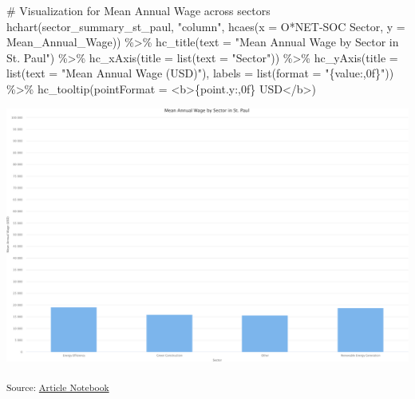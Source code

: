 \documentclass[
  letterpaper,
  DIV=11,
  numbers=noendperiod]{scrartcl}
\newenvironment{Shaded}{\begin{snugshade}}{\end{snugshade}}
\newcommand{\AttributeTok}[1]{\textcolor[rgb]{0.40,0.45,0.13}{#1}}
\newcommand{\CommentTok}[1]{\textcolor[rgb]{0.37,0.37,0.37}{#1}}
\newcommand{\FunctionTok}[1]{\textcolor[rgb]{0.28,0.35,0.67}{#1}}
\newcommand{\NormalTok}[1]{\textcolor[rgb]{0.00,0.23,0.31}{#1}}
\newcommand{\SpecialCharTok}[1]{\textcolor[rgb]{0.37,0.37,0.37}{#1}}
\newcommand{\StringTok}[1]{\textcolor[rgb]{0.13,0.47,0.30}{#1}}
\begin{document}
\begin{Shaded}
\begin{Highlighting}[]
\CommentTok{\# Visualization for Mean Annual Wage across sectors}
\FunctionTok{hchart}\NormalTok{(sector\_summary\_st\_paul, }\StringTok{"column"}\NormalTok{, }\FunctionTok{hcaes}\NormalTok{(}\AttributeTok{x =} \StringTok{\textasciigrave{}}\AttributeTok{O*NET{-}SOC Sector}\StringTok{\textasciigrave{}}\NormalTok{, }\AttributeTok{y =}\NormalTok{ Mean\_Annual\_Wage)) }\SpecialCharTok{\%\textgreater{}\%}
  \FunctionTok{hc\_title}\NormalTok{(}\AttributeTok{text =} \StringTok{"Mean Annual Wage by Sector in St. Paul"}\NormalTok{) }\SpecialCharTok{\%\textgreater{}\%}
  \FunctionTok{hc\_xAxis}\NormalTok{(}\AttributeTok{title =} \FunctionTok{list}\NormalTok{(}\AttributeTok{text =} \StringTok{"Sector"}\NormalTok{)) }\SpecialCharTok{\%\textgreater{}\%}
  \FunctionTok{hc\_yAxis}\NormalTok{(}\AttributeTok{title =} \FunctionTok{list}\NormalTok{(}\AttributeTok{text =} \StringTok{"Mean Annual Wage (USD)"}\NormalTok{), }\AttributeTok{labels =} \FunctionTok{list}\NormalTok{(}\AttributeTok{format =} \StringTok{"\{value:,0f\}"}\NormalTok{)) }\SpecialCharTok{\%\textgreater{}\%}
  \FunctionTok{hc\_tooltip}\NormalTok{(}\AttributeTok{pointFormat =} \StringTok{\textquotesingle{}\textless{}b\textgreater{}\{point.y:,0f\} USD\textless{}/b\textgreater{}\textquotesingle{}}\NormalTok{)}
\end{Highlighting}
\end{Shaded}

\includegraphics{index_files/figure-pdf/unnamed-chunk-36-3.pdf}

\textsubscript{Source:
\href{https://beeckcenter.github.io/climate-equity-workforce/index-preview.html}{Article
Notebook}}
\end{document}
